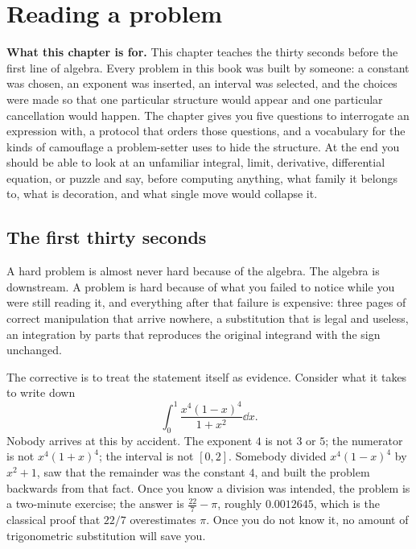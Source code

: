 \chapter{Reading a problem}

\begin{orient}
\textbf{What this chapter is for.} This chapter teaches the thirty seconds before the first line of algebra. Every problem in this book was built by someone: a constant was chosen, an exponent was inserted, an interval was selected, and the choices were made so that one particular structure would appear and one particular cancellation would happen. The chapter gives you five questions to interrogate an expression with, a protocol that orders those questions, and a vocabulary for the kinds of camouflage a problem-setter uses to hide the structure. At the end you should be able to look at an unfamiliar integral, limit, derivative, differential equation, or puzzle and say, before computing anything, what family it belongs to, what is decoration, and what single move would collapse it.
\end{orient}

\section{The first thirty seconds}

A hard problem is almost never hard because of the algebra. The algebra is downstream. A problem is hard because of what you failed to notice while you were still reading it, and everything after that failure is expensive: three pages of correct manipulation that arrive nowhere, a substitution that is legal and useless, an integration by parts that reproduces the original integrand with the sign unchanged.

The corrective is to treat the statement itself as evidence. Consider what it takes to write down
\[
\int_{0}^{1}\frac{x^{4}(1-x)^{4}}{1+x^{2}}\dd x .
\]
Nobody arrives at this by accident. The exponent $4$ is not $3$ or $5$; the numerator is not $x^{4}(1+x)^{4}$; the interval is not $[0,2]$. Somebody divided $x^{4}(1-x)^{4}$ by $x^{2}+1$, saw that the remainder was the constant $4$, and built the problem backwards from that fact. Once you know a division was intended, the problem is a two-minute exercise; the answer is $\tfrac{22}{7}-\pi$, roughly $0.0012645$, which is the classical proof that $22/7$ overestimates $\pi$. Once you do not know it, no amount of trigonometric substitution will save you.

